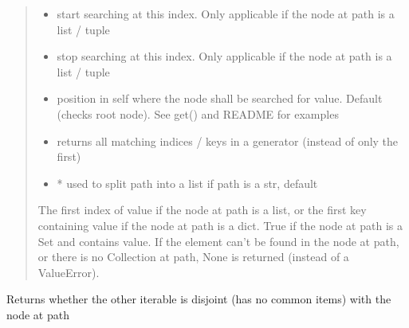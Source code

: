 \documentclass[a4paper,10pt,english]{sphinxmanual}
\begin{document}
\begin{fulllineitems}
\begin{fulllineitems}
\begin{quote}
\begin{description}
\begin{itemize}
\item {}
\sphinxAtStartPar
{} \textendash{} start searching at this index. Only applicable if the node at path is a list / tuple

\item {}
\sphinxAtStartPar
{} \textendash{} stop searching at this index. Only applicable if the node at path is a list / tuple

\item {}
\sphinxAtStartPar
{} \textendash{} position in self where the node shall be searched for value. Default  (checks root node). See
get() and README for examples

\item {}
\sphinxAtStartPar
{} \textendash{} returns all matching indices / keys in a generator (instead of only the first)

\item {}
\sphinxAtStartPar
{} \textendash{} * used to split path into a list if path is a str, default 

\end{itemize}

\sphinxAtStartPar
The first index of value if the node at path is a list, or the first key containing value if the node at
path is a dict. True if the node at path is a Set and contains value. If the element can’t be found in the
node at path, or there is no Collection at path, None is returned (instead of a ValueError).

\end{description}\end{quote}

\end{fulllineitems}


\begin{fulllineitems}
\label{\detokenize{fagus.fagus:fagus.fagus.Fagus.isdisjoint}}
\pysigstartsignatures
{}
\pysigstopsignatures
\sphinxAtStartPar
Returns whether the other iterable is disjoint (has no common items) with the node at path


\end{fulllineitems}
\end{fulllineitems}
\end{document}
